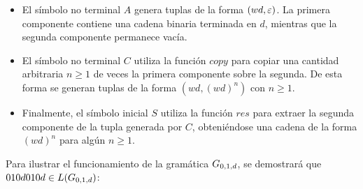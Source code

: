 \begin{itemize}
    \item El símbolo no terminal $A$ genera tuplas de la forma $(wd, \varepsilon)$. La primera componente contiene una cadena binaria terminada en $d$, mientras que la segunda componente permanece vacía.
    \item El símbolo no terminal $C$ utiliza la función $copy$ para copiar una cantidad arbitraria $n \geq 1$ de veces la primera componente sobre la segunda. De esta forma se generan tuplas de la forma $(wd, (wd)^n)$ con $ n\geq 1$.
    \item Finalmente, el símbolo inicial $S$ utiliza la función $res$ para extraer la segunda componente de la tupla generada por $C$, obteniéndose una cadena de la forma $(wd)^n$ para algún $n \geq 1$.

\end{itemize}

Para ilustrar el funcionamiento de la gramática $G_{0, 1, d}$, se demostrará que $010d010d \in L(G_{0, 1, d})$:

